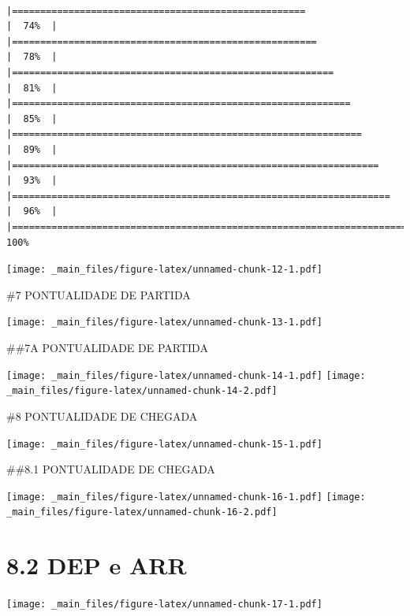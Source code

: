 \documentclass[
]{book}
\theoremstyle{definition}
\theoremstyle{definition}
\theoremstyle{definition}
\theoremstyle{definition}
\theoremstyle{remark}
\begin{document}
\begin{verbatim}
                                                                            |====================================================                  |  74%  |                                                                              |======================================================                |  78%  |                                                                              |=========================================================             |  81%  |                                                                              |============================================================          |  85%  |                                                                              |==============================================================        |  89%  |                                                                              |=================================================================     |  93%  |                                                                              |===================================================================   |  96%  |                                                                              |======================================================================| 100%
\end{verbatim}

\texttt{[image: \_main\_files/figure-latex/unnamed-chunk-12-1.pdf]}

\#7 PONTUALIDADE DE PARTIDA

\texttt{[image: \_main\_files/figure-latex/unnamed-chunk-13-1.pdf]}

\#\#7A PONTUALIDADE DE PARTIDA

\texttt{[image: \_main\_files/figure-latex/unnamed-chunk-14-1.pdf]} \texttt{[image: \_main\_files/figure-latex/unnamed-chunk-14-2.pdf]}

\#8 PONTUALIDADE DE CHEGADA

\texttt{[image: \_main\_files/figure-latex/unnamed-chunk-15-1.pdf]}

\#\#8.1 PONTUALIDADE DE CHEGADA

\texttt{[image: \_main\_files/figure-latex/unnamed-chunk-16-1.pdf]} \texttt{[image: \_main\_files/figure-latex/unnamed-chunk-16-2.pdf]}

\hypertarget{dep-e-arr}{%
\section{8.2 DEP e ARR}\label{dep-e-arr}}

\texttt{[image: \_main\_files/figure-latex/unnamed-chunk-17-1.pdf]}
\end{document}
